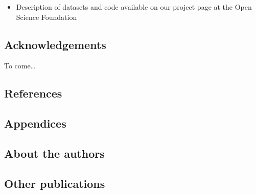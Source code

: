 \documentclass[
  letterpaper,
  DIV=11,
  numbers=noendperiod]{scrartcl}
\providecommand{\tightlist}{%
  \setlength{\itemsep}{0pt}\setlength{\parskip}{0pt}}\usepackage{longtable,booktabs,array}
\begin{document}
\begin{itemize}
\tightlist
\item
  Description of datasets and code available on our project page at the
  Open Science Foundation
\end{itemize}

\subsection{Acknowledgements}\label{acknowledgements}

To come\ldots{}

\subsection{References}\label{references}

\subsection{Appendices}\label{appendices}

\subsection{About the authors}\label{about-the-authors}

\subsection*{Other publications}\label{other-publications}
\end{document}
